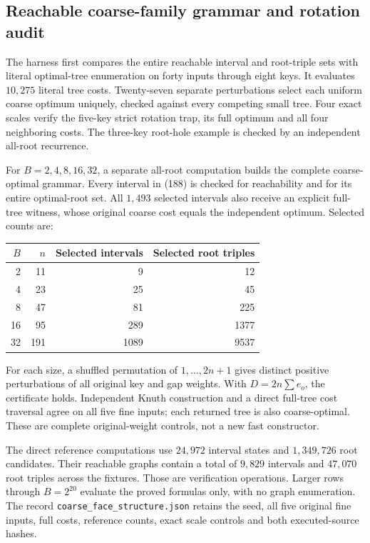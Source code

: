 \documentclass[11pt]{article}
\begin{document}
\subsection{Reachable coarse-family grammar and rotation audit}
\label{app:coarse-structure}
The harness first compares the entire reachable interval and root-triple
sets with literal optimal-tree enumeration on forty inputs through eight
keys. It evaluates $10{,}275$ literal tree costs. Twenty-seven separate
perturbations select each uniform coarse optimum uniquely, checked against
every competing small tree. Four exact scales verify the five-key strict
rotation trap, its full optimum and all four neighboring costs. The
three-key root-hole example is checked by an independent all-root recurrence.

For $B=2,4,8,16,32$, a separate all-root computation builds the complete
coarse-optimal grammar. Every interval in
(188) is checked for reachability and for its
entire optimal-root set. All $1{,}493$ selected intervals also receive an
explicit full-tree witness, whose original coarse cost equals the
independent optimum. Selected counts are:
\begin{center}
\begin{tabular}{rrrr}
\toprule
$B$ & $n$ & Selected intervals & Selected root triples\\
\midrule
2 & 11 & 9 & 12\\
4 & 23 & 25 & 45\\
8 & 47 & 81 & 225\\
16 & 95 & 289 & 1377\\
32 & 191 & 1089 & 9537\\
\bottomrule
\end{tabular}
\end{center}
For each size, a shuffled permutation of $1,\ldots,2n+1$ gives distinct
positive perturbations of all original key and gap weights. With
$D=2n\sum e_o$, the certificate holds. Independent Knuth construction and
a direct full-tree cost traversal agree on all five fine inputs; each
returned tree is also coarse-optimal. These are complete original-weight
controls, not a new fast constructor.

The direct reference computations use $24{,}972$ interval states and
$1{,}349{,}726$ root candidates. Their reachable graphs contain a total of
$9{,}829$ intervals and $47{,}070$ root triples across the fixtures. Those
are verification operations. Larger rows through $B=2^{20}$ evaluate the
proved formulas only, with no graph enumeration. The record
\texttt{coarse\_face\_structure.json} retains the seed, all five original
fine inputs, full costs, reference counts, exact scale controls and both
executed-source hashes.
\end{document}
